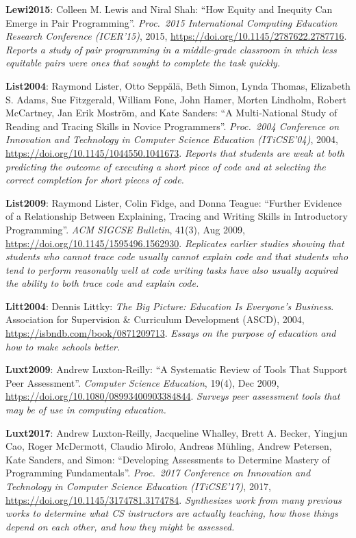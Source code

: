 \textbf{\hypertarget{b:Lewi2015}{Lewi2015}\label{b:Lewi2015}}: Colleen M. Lewis and Niral Shah: ``How Equity and Inequity Can Emerge in Pair Programming''. \emph{Proc.\ 2015 International Computing Education Research Conference (ICER'15)}, 2015, \url{https://doi.org/10.1145/2787622.2787716}. \emph{Reports a study of pair programming in a middle-grade classroom in which less equitable pairs were ones that sought to complete the task quickly.}

\textbf{\hypertarget{b:List2004}{List2004}\label{b:List2004}}: Raymond Lister, Otto Seppälä, Beth Simon, Lynda Thomas, Elizabeth S. Adams, Sue Fitzgerald, William Fone, John Hamer, Morten Lindholm, Robert McCartney, Jan Erik Moström, and Kate Sanders: ``A Multi-National Study of Reading and Tracing Skills in Novice Programmers''. \emph{Proc.\ 2004 Conference on Innovation and Technology in Computer Science Education (ITiCSE'04)}, 2004, \url{https://doi.org/10.1145/1044550.1041673}. \emph{Reports that students are weak at both predicting the outcome of executing a short piece of code and at selecting the correct completion for short pieces of code.}

\textbf{\hypertarget{b:List2009}{List2009}\label{b:List2009}}: Raymond Lister, Colin Fidge, and Donna Teague: ``Further Evidence of a Relationship Between Explaining, Tracing and Writing Skills in Introductory Programming''. \emph{ACM SIGCSE Bulletin}, 41(3), Aug 2009, \url{https://doi.org/10.1145/1595496.1562930}. \emph{Replicates earlier studies showing that students who cannot trace code usually cannot explain code and that students who tend to perform reasonably well at code writing tasks have also usually acquired the ability to both trace code and explain code.}

\textbf{\hypertarget{b:Litt2004}{Litt2004}\label{b:Litt2004}}: Dennis Littky: \emph{The Big Picture: Education Is Everyone's Business}. Association for Supervision \& Curriculum Development (ASCD), 2004, \url{https://isbndb.com/book/0871209713}. \emph{Essays on the purpose of education and how to make schools better.}

\textbf{\hypertarget{b:Luxt2009}{Luxt2009}\label{b:Luxt2009}}: Andrew Luxton-Reilly: ``A Systematic Review of Tools That Support Peer Assessment''. \emph{Computer Science Education}, 19(4), Dec 2009, \url{https://doi.org/10.1080/08993400903384844}. \emph{Surveys peer assessment tools that may be of use in computing education.}

\textbf{\hypertarget{b:Luxt2017}{Luxt2017}\label{b:Luxt2017}}: Andrew Luxton-Reilly, Jacqueline Whalley, Brett A. Becker, Yingjun Cao, Roger McDermott, Claudio Mirolo, Andreas Mühling, Andrew Petersen, Kate Sanders, and Simon: ``Developing Assessments to Determine Mastery of Programming Fundamentals''. \emph{Proc.\ 2017 Conference on Innovation and Technology in Computer Science Education (ITiCSE'17)}, 2017, \url{https://doi.org/10.1145/3174781.3174784}. \emph{Synthesizes work from many previous works to determine what CS instructors are actually teaching, how those things depend on each other, and how they might be assessed.}

